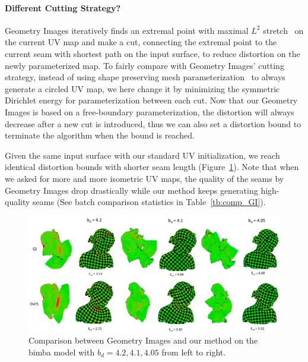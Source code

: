 \paragraph{Different Cutting Strategy?}
Geometry Images iteratively finds an extremal point with maximal $L^2$ stretch~\cite{} on the current UV map and make a cut, connecting the extremal point to the current seam with shortest path on the input surface, to reduce distortion on the newly parameterized map. To fairly compare with Geometry Images' cutting strategy, instead of using shape preserving mesh parameterization~\cite{} to always generate a circled UV map, we here change it by minimizing the symmetric Dirichlet energy for parameterization between each cut. Now that our Geometry Images is based on a free-boundary parameterization, the distortion will always decrease after a new cut is introduced, thus we can also set a distortion bound to terminate the algorithm when the bound is reached.

Given the same input surface with our standard UV initialization, we reach identical distortion bounds with shorter seam length (Figure~\ref{fig:comp_GI}). Note that when we asked for more and more isometric UV maps, the quality of the seams by Geometry Images drop drastically while our method keeps generating high-quality seams (See batch comparison statistics in Table~\ref{tb:comp_GI}).

\begin{figure}[!h]
\centering
\includegraphics[width=\linewidth]{fig/comp_GI.png}
\caption{Comparison between Geometry Images and our method on the bimba model with $b_d = 4.2, 4.1, 4.05$ from left to right.}
\label{fig:comp_GI}
\end{figure}

